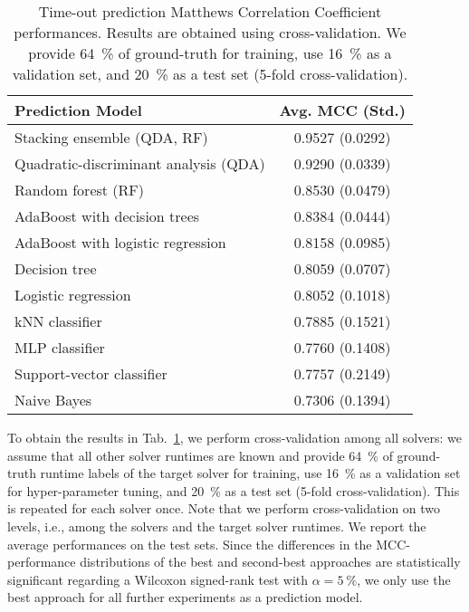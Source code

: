 \documentclass[runningheads]{llncs}
\begin{document}
\begin{table}
  \centering
  \caption{
  	Time-out prediction Matthews Correlation Coefficient performances.
  	Results are obtained using cross-validation.
  	We provide \SI{64}{\%} of ground-truth for training, use \SI{16}{\%} as a validation set, and \SI{20}{\%} as a test set (5-fold cross-validation).
  }
  \label{tab:mcc}
  \begin{tabular}{lc}
    Prediction Model & Avg. MCC (Std.) \\
    \hline
    Stacking ensemble (QDA, RF)           & 0.9527 (0.0292) \\
    Quadratic-discriminant analysis (QDA) & 0.9290 (0.0339) \\
    Random forest (RF)                    & 0.8530 (0.0479) \\
    AdaBoost with decision trees          & 0.8384 (0.0444) \\
    AdaBoost with logistic regression     & 0.8158 (0.0985) \\
    Decision tree                         & 0.8059 (0.0707) \\
    Logistic regression                   & 0.8052 (0.1018) \\
    kNN classifier                        & 0.7885 (0.1521) \\
    MLP classifier                        & 0.7760 (0.1408) \\
    Support-vector classifier             & 0.7757 (0.2149) \\
    Naive Bayes                           & 0.7306 (0.1394) \\
    \hline
  \end{tabular}
\end{table}


To obtain the results in Tab.~\ref{tab:mcc}, we perform cross-validation among all solvers: we assume that all other solver runtimes are known and provide \SI{64}{\%} of ground-truth runtime labels of the target solver for training, use \SI{16}{\%} as a validation set for hyper-parameter tuning, and \SI{20}{\%} as a test set (5-fold cross-validation).
This is repeated for each solver once.
Note that we perform cross-validation on two levels, i.e., among the solvers and the target solver runtimes.
We report the average performances on the test sets.
Since the differences in the MCC-performance distributions of the best and second-best approaches are statistically significant regarding a Wilcoxon signed-rank test with $\alpha = \SI{5}{\%}$, we only use the best approach for all further experiments as a prediction model.
\end{document}
